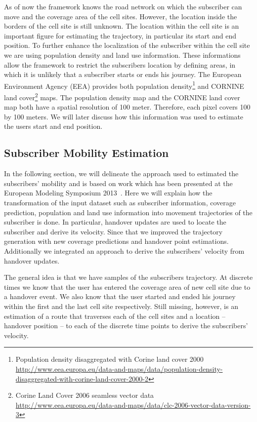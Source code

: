 \documentclass[twocolumn]{bmcart}%
\begin{document}
As of now the framework knows the road network on which the subscriber can move and the coverage area of the cell sites. However, the location inside the borders of the cell site is still unknown. The location within the cell site is an important figure for estimating the trajectory, in particular its start and end position. To further enhance the localization of the subscriber within the cell site we are using population density and land use information. These informations allow the framework to restrict the subscribers location by defining areas, in which it is unlikely that a subscriber starts or ends his journey. The European Environment Agency (EEA) provides both population density\footnote{Population density disaggregated with Corine land cover 2000 \url{http://www.eea.europa.eu/data-and-maps/data/population-density-disaggregated-with-corine-land-cover-2000-2}} and CORNINE land cover\footnote{Corine Land Cover 2006 seamless vector data \url{http://www.eea.europa.eu/data-and-maps/data/clc-2006-vector-data-version-3}} maps. The population density map and the CORNINE land cover map both have a spatial resolution of 100 meter. Therefore, each pixel covers 100 by 100 meters. We will later discuss how this information was used to estimate the users start and end position.

\subsection*{Subscriber Mobility Estimation}
In the following section, we will delineate the approach used to estimated the subscribers' mobility and is based on work which has been presented at the European Modeling Symposium 2013~\cite{Kieslich2013}. Here we will explain how the transformation of the input dataset such as subscriber information, coverage prediction, population and land use information into movement trajectories of the subscriber is done. In particular, handover updates are used to locate the subscriber and derive its velocity. Since that we improved the trajectory generation with new coverage predictions and handover point estimations. Additionally we integrated an approach to derive the subscribers' velocity from handover updates.

The general idea is that we have samples of the subscribers trajectory. At discrete times we know that the user has entered the coverage area of new cell site due to a handover event. We also know that the user started and ended his journey within the first and the last cell site respectively. Still missing, however, is an estimation of a route that traverses each of the cell sites and a location -- handover position -- to each of the discrete time points to derive the subscribers' velocity.
\end{document}
